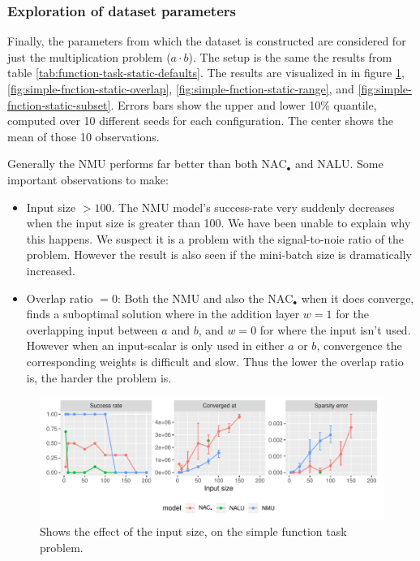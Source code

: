 

\subsubsection{Exploration of dataset parameters}

Finally, the parameters from which the dataset is constructed are considered for just the multiplication problem ($a \cdot b$). The setup is the same the results from table \ref{tab:function-task-static-defaults}. The results are visualized in in figure \ref{fig:simple-fnction-static-input-size}, \ref{fig:simple-fnction-static-overlap}, \ref{fig:simple-fnction-static-range}, and \ref{fig:simple-fnction-static-subset}. Errors bars show the upper and lower 10\% quantile, computed over 10 different seeds for each configuration. The center shows the mean of those 10 observations.

Generally the NMU performs far better than both $\mathrm{NAC}_{\bullet}$ and NALU. Some important observations to make:

\begin{itemize}
\item Input size $> 100$. The NMU model's success-rate very suddenly decreases when the input size is greater than 100. We have been unable to explain why this happens. We suspect it is a problem with the signal-to-noie ratio of the problem. However the result is also seen if the mini-batch size is dramatically increased.
\item Overlap ratio $= 0$: Both the NMU and also the $\mathrm{NAC}_{\bullet}$ when it does converge, finds a suboptimal solution where in the addition layer $w=1$ for the overlapping input between $a$ and $b$, and $w = 0$ for where the input isn't used. However when an input-scalar is only used in either $a$ or $b$, convergence the corresponding weights is difficult and slow. Thus the lower the overlap ratio is, the harder the problem is.
\end{itemize}

\begin{figure}[H]
\centering
\includegraphics[width=\linewidth]{results/simple_function_static_input_size.pdf}
\caption{Shows the effect of the input size, on the simple function task problem.}
\label{fig:simple-fnction-static-input-size}
\end{figure}

